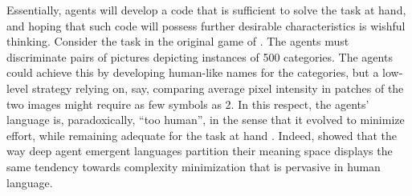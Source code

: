 

Essentially, agents will develop a code that is sufficient to solve
the task at hand, and hoping that such code will possess further
desirable characteristics is wishful thinking. Consider the task in
the original game of . The agents must
discriminate pairs of pictures depicting instances of 500
categories. The agents could achieve this by developing human-like
names for the categories, but a low-level strategy relying on, say,
comparing average pixel intensity in patches of the two images might
require as few symbols as 2. In this respect, the
agents' language is, paradoxically, ``too human'', in the sense that
it evolved to minimize effort, while remaining adequate for the task
at hand \cite{Gibson:etal:2019}. %
Indeed,  showed
that the way deep agent emergent languages partition their
meaning space displays the same tendency towards complexity minimization
that is pervasive in human language.

